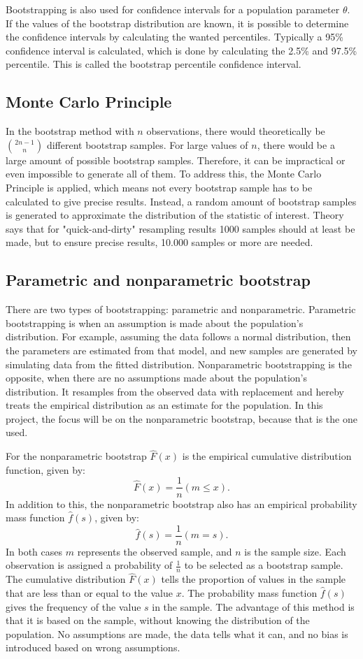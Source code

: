 Bootstrapping is also used for confidence intervals for a population parameter $\theta$. If the values of the bootstrap distribution are known, it is possible to determine the confidence intervals by calculating the wanted percentiles. Typically a 95\% confidence interval is calculated, which is done by calculating the 2.5\% and 97.5\% percentile. This is called the bootstrap percentile confidence interval.

\subsection{Monte Carlo Principle}
In the bootstrap method with $n$ observations, there would theoretically be $\binom{2n-1}{n}$ different bootstrap samples. For large values of $n$, there would be a large amount of possible bootstrap samples. Therefore, it can be impractical or even impossible to generate all of them. To address this, the Monte Carlo Principle is applied, which means not every bootstrap sample has to be calculated to give precise results. Instead, a random amount of bootstrap samples is generated to approximate the distribution of the statistic of interest. Theory says that for "quick-and-dirty" resampling results 1000 samples should at least be made, but to ensure precise results, 10.000 samples or more are needed.

\subsection{Parametric and nonparametric bootstrap}
There are two types of bootstrapping: parametric and nonparametric. Parametric bootstrapping is when an assumption is made about the population's distribution. For example, assuming the data follows a normal distribution, then the parameters are estimated from that model, and new samples are generated by simulating data from the fitted distribution. Nonparametric bootstrapping is the opposite, when there are no assumptions made about the population's distribution. It resamples from the observed data with replacement and hereby treats the empirical distribution as an estimate for the population. In this project, the focus will be on the nonparametric bootstrap, because that is the one used. \newline

For the nonparametric bootstrap $\hat{F}(x)$ is the empirical cumulative distribution function, given by:
$$\hat{F}(x)=\frac{1}{n}(m\leq x).$$
In addition to this, the nonparametric bootstrap also has an empirical probability mass function $\hat{f}(s)$, given by:
$$\hat{f}(s)=\frac{1}{n}(m=s).$$
In both cases $m$ represents the observed sample, and $n$ is the sample size. Each observation is assigned a probability of $\frac{1}{n}$ to be selected as a bootstrap sample. The  cumulative distribution $\hat{F}(x)$ tells the proportion of values in the sample that are less than or equal to the value $x$. The probability mass function $\hat{f}(s)$ gives the frequency of the value $s$ in the sample. The advantage of this method is that it is based on the sample, without knowing the distribution of the population. No assumptions are made, the data tells what it can, and no bias is introduced based on wrong assumptions.